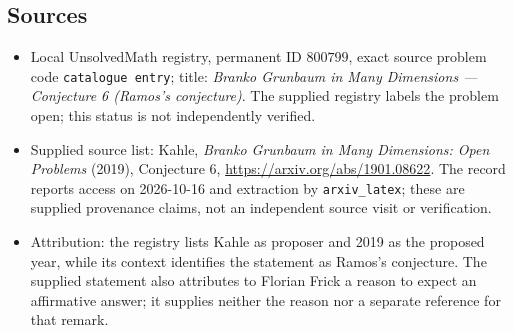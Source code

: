 \documentclass[11pt]{article}
\begin{document}
\subsection{Sources}
\begin{itemize}
\item Local UnsolvedMath registry, permanent ID \(800799\), exact source problem code \texttt{catalogue entry}; title: \emph{Branko Grunbaum in Many Dimensions --- Conjecture 6 (Ramos's conjecture)}. The supplied registry labels the problem open; this status is not independently verified.
\item Supplied source list: Kahle, \emph{Branko Grunbaum in Many Dimensions: Open Problems} (2019), Conjecture 6, \url{https://arxiv.org/abs/1901.08622}. The record reports access on 2026-10-16 and extraction by \texttt{arxiv\_latex}; these are supplied provenance claims, not an independent source visit or verification.
\item Attribution: the registry lists Kahle as proposer and 2019 as the proposed year, while its context identifies the statement as Ramos's conjecture. The supplied statement also attributes to Florian Frick a reason to expect an affirmative answer; it supplies neither the reason nor a separate reference for that remark.
\end{itemize}
\end{document}
